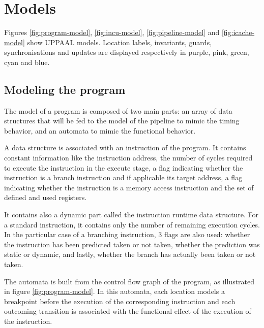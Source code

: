 \section{Models}
\label{sec:model}

  Figures \ref{fig:program-model}, \ref{fig:incu-model}, \ref{fig:pipeline-model} and \ref{fig:icache-model} show UPPAAL 
  models. Location labels, invariants, guards, synchronisations and updates are 
  displayed respectively in purple, pink, green, cyan and blue.

  \subsection{Modeling the program}
  \label{sec:model:program}

    The model of a program is composed of two main parts: an array of data
    structures that will be fed to the model of the pipeline to 
    mimic the timing behavior,
    and an automata to mimic the functional behavior.

    A data structure is associated with an instruction of the program.
    It contains constant information like the instruction address, the number
    of cycles required to execute the instruction in the execute stage, a flag
    indicating whether the instruction is a branch instruction and if applicable
    its target address, a flag indicating whether the instruction is a memory 
    access instruction and the set of defined and used registers.

    It contains also a dynamic part called the instruction runtime data
    structure.
    For a standard instruction, it contains only the number of remaining
    execution cycles.
    In the particular case of a branching instruction, 3 flags are also used:
    whether the instruction has been predicted taken or not taken, whether the
    prediction was static or dynamic, and lastly, whether the branch has
    actually been taken or not taken. 

    The automata is built from the control flow graph of the program, as
    illustrated in figure \ref{fig:program-model}.
    In this automata, each location models a breakpoint before the execution of
    the corresponding instruction and each outcoming transition is associated
    with the functional effect of the execution of the instruction.
    
